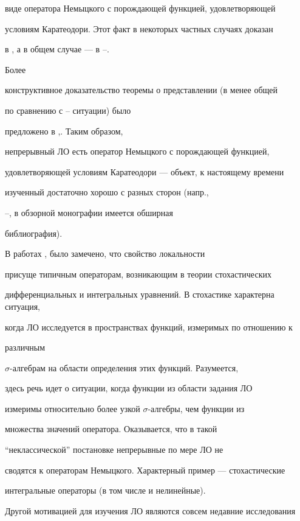 виде оператора Немыцкого с порождающей функцией, удовлетворяющей


условиям Каратеодори. Этот факт в некоторых частных случаях доказан


в \cite{3}, а в общем случае --- в \cite{4}--\cite{6}.


Более


конструктивное доказательство теоремы о представлении (в менее общей


по сравнению с \cite{4}--\cite{6} ситуации) было


предложено в \cite{7},\cite{8}. Таким образом,


непрерывный ЛО есть оператор Немыцкого с порождающей функцией,


удовлетворяющей условиям Каратеодори --- объект, к настоящему времени


изученный достаточно хорошо с разных сторон (напр.,


\cite{1}--\cite{13}, в обзорной монографии \cite{8} имеется обширная


библиография).





В работах \cite{14}, \cite{15} было замечено, что свойство локальности


присуще типичным операторам, возникающим в теории стохастических


дифференциальных и интегральных уравнений. В стохастике характерна ситуация,


когда ЛО исследуется в пространствах функций, измеримых по отношению к


различным


$\sigma$-алгебрам на области определения этих функций. Разумеется,


здесь речь идет о ситуации, когда функции из области задания ЛО


измеримы относительно более узкой $\sigma$-ал\-геб\-ры, чем функции из


множества значений оператора. Оказывается, что в такой


``не\-клас\-си\-чес\-кой'' постановке непрерывные по мере ЛО не


сводятся к операторам Немыцкого. Характерный пример --- стохастические


интегральные операторы (в том числе и не\-ли\-ней\-ные).





Другой мотивацией для изучения ЛО являются совсем недавние исследования


